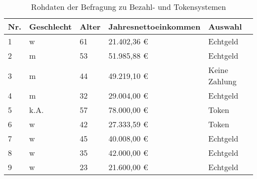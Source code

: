 \begin{table}[H]
\centering
	\caption[Rohdaten der Befragung]{Rohdaten der Befragung zu Bezahl- und Tokensystemen}
\begin{tabular}{lllll}
\hline
\multicolumn{1}{|l|}{\textbf{Nr.}} & \multicolumn{1}{l|}{\textbf{Geschlecht}} & \multicolumn{1}{l|}{\textbf{Alter}} & \multicolumn{1}{l|}{\textbf{Jahresnettoeinkommen}} & \multicolumn{1}{l|}{\textbf{Auswahl}} \\ \hline
1                                  & w                                        & 61                                  & 21.402,36 €                             & Echtgeld                              \\
2                                  & m                                        & 53                                  & 51.985,88 €                             & Echtgeld                              \\
3                                  & m                                        & 44                                  & 49.219,10 €                             & Keine Zahlung                         \\
4                                  & m                                        & 32                                  & 29.004,00 €                             & Echtgeld                              \\
5                                  & k.A.                                     & 57                                  & 78.000,00 €                             & Token                                 \\
6                                  & w                                        & 42                                  & 27.333,59 €                             & Token                                 \\
7                                  & w                                        & 45                                  & 40.008,00 €                             & Echtgeld                              \\
8                                  & w                                        & 35                                  & 42.000,00 €                             & Echtgeld                              \\
9                                  & w                                        & 23                                  & 21.600,00 €                             & Echtgeld                              \\

\end{tabular}
\end{table}
